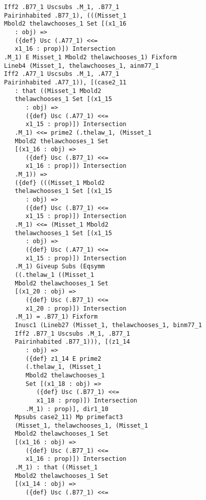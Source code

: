 \documentclass[12pt]{article}
\begin{document}
\begin{verbatim}
             Iff2 .B77_1 Uscsubs .M_1, .B77_1 
             Pairinhabited .B77_1), (((Misset_1 
             Mbold2 thelawchooses_1 Set [(x1_16 
                : obj) => 
                ({def} Usc (.A77_1) <<= 
                x1_16 : prop)]) Intersection 
             .M_1) E Misset_1 Mbold2 thelawchooses_1) Fixform 
             Lineb4 (Misset_1, thelawchooses_1, ainm77_1 
             Iff2 .A77_1 Uscsubs .M_1, .A77_1 
             Pairinhabited .A77_1)), [(case2_11 
                : that ((Misset_1 Mbold2 
                thelawchooses_1 Set [(x1_15 
                   : obj) => 
                   ({def} Usc (.A77_1) <<= 
                   x1_15 : prop)]) Intersection 
                .M_1) <<= prime2 (.thelaw_1, (Misset_1 
                Mbold2 thelawchooses_1 Set 
                [(x1_16 : obj) => 
                   ({def} Usc (.B77_1) <<= 
                   x1_16 : prop)]) Intersection 
                .M_1)) => 
                ({def} (((Misset_1 Mbold2 
                thelawchooses_1 Set [(x1_15 
                   : obj) => 
                   ({def} Usc (.B77_1) <<= 
                   x1_15 : prop)]) Intersection 
                .M_1) <<= (Misset_1 Mbold2 
                thelawchooses_1 Set [(x1_15 
                   : obj) => 
                   ({def} Usc (.A77_1) <<= 
                   x1_15 : prop)]) Intersection 
                .M_1) Giveup Subs (Eqsymm 
                ((.thelaw_1 ((Misset_1 
                Mbold2 thelawchooses_1 Set 
                [(x1_20 : obj) => 
                   ({def} Usc (.B77_1) <<= 
                   x1_20 : prop)]) Intersection 
                .M_1) = .B77_1) Fixform 
                Inusc1 (Lineb27 (Misset_1, thelawchooses_1, binm77_1 
                Iff2 .B77_1 Uscsubs .M_1, .B77_1 
                Pairinhabited .B77_1))), [(z1_14 
                   : obj) => 
                   ({def} z1_14 E prime2 
                   (.thelaw_1, (Misset_1 
                   Mbold2 thelawchooses_1 
                   Set [(x1_18 : obj) => 
                      ({def} Usc (.B77_1) <<= 
                      x1_18 : prop)]) Intersection 
                   .M_1) : prop)], dir1_10 
                Mpsubs case2_11) Mp primefact3 
                (Misset_1, thelawchooses_1, (Misset_1 
                Mbold2 thelawchooses_1 Set 
                [(x1_16 : obj) => 
                   ({def} Usc (.B77_1) <<= 
                   x1_16 : prop)]) Intersection 
                .M_1) : that ((Misset_1 
                Mbold2 thelawchooses_1 Set 
                [(x1_14 : obj) => 
                   ({def} Usc (.B77_1) <<= 

\end{verbatim}
\end{document}

